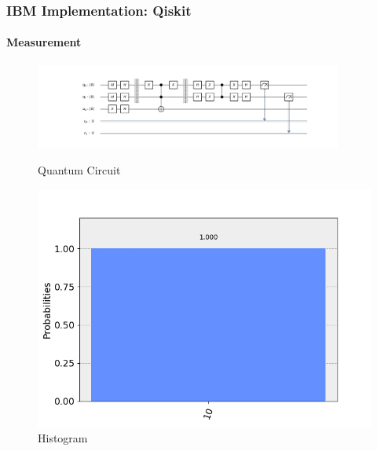 \begin{frame}
	\frametitle{IBM Implementation: Qiskit}
	\framesubtitle{Measurement}
	\begin{figure}[ht]
		\begin{minipage}[b]{0.75\linewidth}
			\centering
			\includegraphics[trim=190 80 190 0,width=0.9\textwidth]{code/data/images/qiskit-circuit.png}
			\caption{Quantum Circuit}
			\label{fig:a}
		\end{minipage}
		\hspace{0.5cm}
		\begin{minipage}[b]{0.2\linewidth}
			\centering
			\includegraphics[width=\textwidth]{code/data/images/qiskit-histogram.png}
			\caption{Histogram}
			\label{fig:b}
		\end{minipage}
	\end{figure}
\end{frame}


